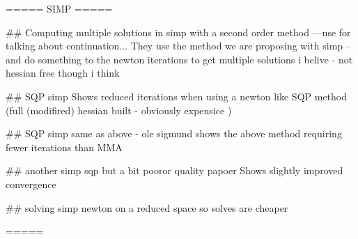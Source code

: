 =====
SIMP
=====

## Computing multiple solutions in simp with a second order method ---use for talking about continuation...
\cite{Papadopoulos2021} 
They use the method we are proposing with simp -- and do something to the newton iterations to get multiple solutions i belive - not hessian free though i think 

## SQP simp 
\cite{RojasLabanda2016}
Shows reduced iterations when using a newton like SQP method (full (modifired) hessian built - obviously expensice )

## SQP simp same as above - ole sigmund
\cite{RojasLabanda2017}
shows the above method requiring fewer iterations than MMA 

## another simp sqp but a bit pooror quality papoer 
\cite{Liao2022}
Shows slightly improved convergence 

## solving simp newton on a reduced space so solves are cheaper 
\cite{Evgrafov2014}

=====